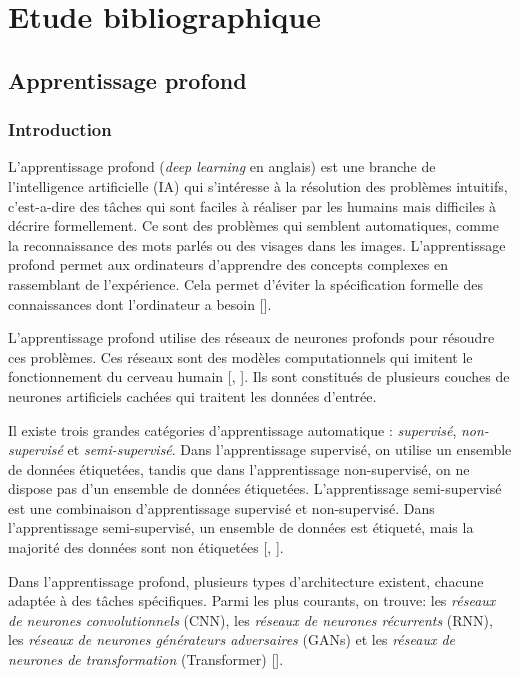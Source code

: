 \part{Etude bibliographique}

\chapter{Apprentissage profond}

\section{Introduction}
L’apprentissage profond (\textit{deep learning} en anglais) est une branche de
l'intelligence artificielle (IA) qui s'intéresse à la résolution des problèmes
intuitifs, c'est-a-dire des tâches qui sont faciles à réaliser par les humains
mais difficiles à décrire formellement. Ce sont des problèmes qui semblent
automatiques, comme la reconnaissance des mots parlés ou des visages dans les
images. L'apprentissage profond permet aux ordinateurs d'apprendre des concepts
complexes en rassemblant de l'expérience. Cela permet d'éviter la spécification
formelle des connaissances dont l'ordinateur a besoin
	[\cite{Goodfellow-et-al-2016}].

\medskip
L'apprentissage profond utilise des réseaux de neurones profonds pour résoudre ces problèmes.
Ces réseaux sont des modèles computationnels qui imitent le fonctionnement
du cerveau humain [\cite{mcculloch_pitts_1943_nervous_activity}, \cite{rosenblatt_1958_perceptron}].
Ils sont constitués de plusieurs couches de neurones artificiels cachées qui traitent les données d'entrée.

\medskip
Il existe trois grandes catégories d'apprentissage automatique : \textit{supervisé}, \textit{non-supervisé} et \textit{semi-supervisé}. Dans l'apprentissage supervisé, on utilise un ensemble de données étiquetées, tandis que dans l'apprentissage non-supervisé, on ne dispose pas d'un ensemble de données étiquetées. L'apprentissage semi-supervisé est une combinaison d'apprentissage supervisé et non-supervisé. Dans l'apprentissage semi-supervisé, un ensemble de données est étiqueté, mais la majorité des données sont non étiquetées [\cite{Goodfellow-et-al-2016}, \cite{bishop_2016}].

\medskip
Dans l'apprentissage profond, plusieurs types d'architecture existent, chacune adaptée à des tâches spécifiques. Parmi les plus courants, on trouve: les \textit{réseaux de neurones convolutionnels} (CNN), les \textit{réseaux de neurones récurrents} (RNN), les \textit{réseaux de neurones générateurs adversaires} (GANs) et les \textit{réseaux de neurones de transformation} (Transformer) [\cite{Goodfellow-et-al-2016}].

